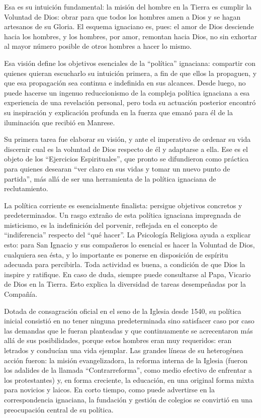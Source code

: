\documentclass[
]{book}
\begin{document}
Esa es su intuición fundamental: la misión del hombre en la Tierra es cumplir la Voluntad de Dios: obrar para que todos los hombres amen a Dios y se hagan artesanos de su Gloria. El esquema ignaciano es, pues: el amor de Dios desciende hacia los hombres, y los hombres, por amor, remontan hacia Dios, no sin exhortar al mayor número posible de otros hombres a hacer lo mismo.

Esa visión define los objetivos esenciales de la ``política'' ignaciana: compartir con quienes quieran escucharlo su intuición primera, a fin de que ellos la propaguen, y que esa propagación sea continua e indefinida en sus alcances. Desde luego, no puede hacerse un ingenuo reduccionismo de la compleja política ignaciana a esa experiencia de una revelación personal, pero toda su actuación posterior encontró su inspiración y explicación profunda en la fuerza que emanó para él de la iluminación que recibió en Manrese.

Su primera tarea fue elaborar su visión, y ante el imperativo de ordenar su vida discernir cual es la voluntad de Dios respecto de él y adaptarse a ella. Ese es el objeto de los ``Ejercicios Espirituales'', que pronto se difundieron como práctica para quienes desearan ``ver claro en sus vidas y tomar un nuevo punto de partida'', más allá de ser una herramienta de la política ignaciana de reclutamiento.

La política corriente es esencialmente finalista: persigue objetivos concretos y predeterminados. Un rasgo extraño de esta política ignaciana impregnada de misticismo, es la indefinición del porvenir, reflejada en el concepto de ``indiferencia'' respecto del ``qué hacer''. La Psicología Religiosa ayuda a explicar esto: para San Ignacio y sus compañeros lo esencial es hacer la Voluntad de Dios, cualquiera sea ésta, y lo importante es ponerse en disposición de espíritu adecuada para percibirla. Toda actividad es buena, a condición de que Dios la inspire y ratifique. En caso de duda, siempre puede consultarse al Papa, Vicario de Dios en la Tierra. Esto explica la diversidad de tareas desempeñadas por la Compañía.

Dotada de consagración oficial en el seno de la Iglesia desde 1540, su política inicial consistió en no tener ninguna predeterminada sino satisfacer caso por caso las demandas que le fueran planteadas y que continuamente se acrecentaron más allá de sus posibilidades, porque estos hombres eran muy requeridos: eran letrados y conducían una vida ejemplar. Las grandes líneas de su heterogénea acción fueron: la misión evangelizadora, la reforma interna de la Iglesia (fueron los adalides de la llamada ``Contrarreforma'', como medio efectivo de enfrentar a los protestantes) y, en forma creciente, la educación, en una original forma mixta para novicios y laicos. En corto tiempo, como puede advertirse en la correspondencia ignaciana, la fundación y gestión de colegios se convirtió en una preocupación central de su política.
\end{document}
